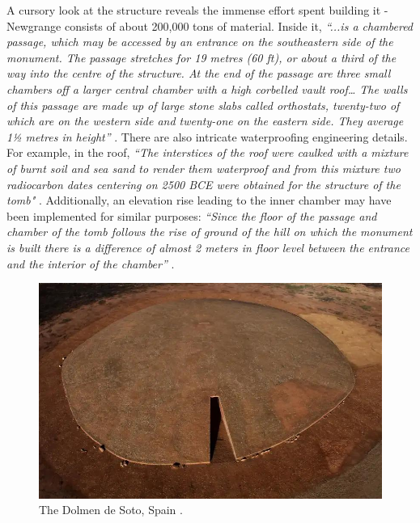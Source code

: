 \documentclass[10pt,twocolumn,letterpaper]{article}
\begin{document}
A cursory look at the structure reveals the immense effort spent building it - Newgrange consists of about 200,000 tons of material. Inside it, \textit{“...is a chambered passage, which may be accessed by an entrance on the southeastern side of the monument. The passage stretches for 19 metres (60 ft), or about a third of the way into the centre of the structure. At the end of the passage are three small chambers off a larger central chamber with a high corbelled vault roof… The walls of this passage are made up of large stone slabs called orthostats, twenty-two of which are on the western side and twenty-one on the eastern side. They average 1½ metres in height”} \cite{70}. There are also intricate waterproofing engineering details. For example, in the roof, \textit{“The interstices of the roof were caulked with a mixture of burnt soil and sea sand to render them waterproof and from this mixture two radiocarbon dates centering on 2500 BCE were obtained for the structure of the tomb"} \cite{71}. Additionally, an elevation rise leading to the inner chamber may have been implemented for similar purposes: \textit{“Since the floor of the passage and chamber of the tomb follows the rise of ground of the hill on which the monument is built there is a difference of almost 2 meters in floor level between the entrance and the interior of the chamber”} \cite{71}.

\begin{figure}[b]
\begin{center}
   \includegraphics[width=1\linewidth]{dolmen.jpg}
\end{center}
   \caption{The Dolmen de Soto, Spain \cite{53}.}
\label{fig:9}
\label{fig:onecol}
\end{figure}
\end{document}
